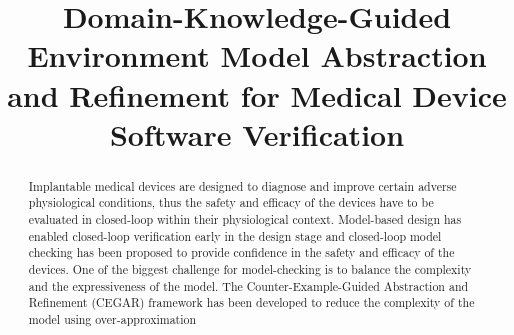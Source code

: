 \documentclass{llncs}
\title{Domain-Knowledge-Guided Environment Model Abstraction and Refinement for Medical Device Software Verification}
\begin{document}
\maketitle

\begin{abstract}
Implantable medical devices are designed to diagnose and improve certain adverse physiological conditions, thus the safety and efficacy of the devices have to be evaluated in closed-loop within their physiological context. Model-based design has enabled closed-loop verification early in the design stage and closed-loop model checking has been proposed to provide confidence in the safety and efficacy of the devices. One of the biggest challenge for model-checking is to balance the complexity and the expressiveness of the model. The Counter-Example-Guided Abstraction and Refinement (CEGAR) framework has been developed to reduce the complexity of the model using over-approximation 
\end{abstract}
\end{document}
